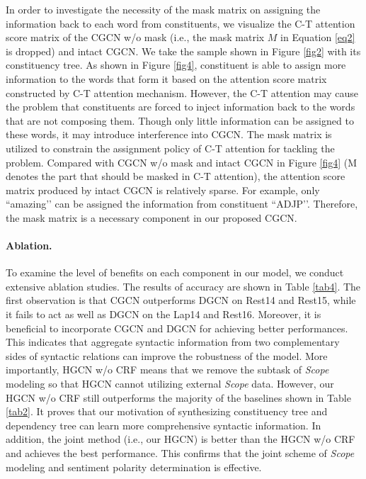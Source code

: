 \documentclass{article}
\begin{document}
In order to investigate the necessity of the mask matrix on assigning the information back to each word from constituents, we visualize the C-T attention score matrix of the CGCN w/o mask (i.e., the mask matrix $M$ in Equation \ref{eq2} is dropped) and intact CGCN. We take the sample shown in Figure \ref{fig2} with its constituency tree. As shown in Figure \ref{fig4}, constituent is able to assign more information to the words that form it based on the attention score matrix constructed by C-T attention mechanism. However, the C-T attention may cause the problem that constituents are forced to inject information back to the words that are not composing them. Though only little information can be assigned to these words, it may introduce interference into CGCN. The mask matrix is utilized to constrain the assignment policy of C-T attention for tackling the problem. Compared with CGCN w/o mask and intact CGCN in Figure \ref{fig4} (M denotes the part that should be masked in C-T attention), the attention score matrix produced by intact CGCN is relatively sparse. For example, only ``amazing’’ can be assigned the information from constituent ``ADJP’’. Therefore, the mask matrix is a necessary component in our proposed CGCN.

\paragraph{Ablation.}

To examine the level of benefits on each component in our model, we conduct extensive ablation studies. The results of accuracy are shown in Table \ref{tab4}. The first observation is that CGCN outperforms DGCN on Rest14 and Rest15, while it fails to act as well as DGCN on the Lap14 and Rest16. Moreover, it is beneficial to incorporate CGCN and DGCN for achieving better performances. This indicates that aggregate syntactic information from two complementary sides of syntactic relations can improve the robustness of the model. More importantly, HGCN w/o CRF means that we remove the subtask of \emph{Scope} modeling so that HGCN cannot utilizing external \emph{Scope} data. However, our HGCN w/o CRF still outperforms the majority of the baselines shown in Table \ref{tab2}. It proves that our motivation of synthesizing constituency tree and dependency tree can learn more comprehensive syntactic information. In addition, the joint method (i.e., our HGCN) is better than the HGCN w/o CRF and achieves the best performance. This confirms that the joint scheme of \emph{Scope} modeling and sentiment polarity determination is effective.
\end{document}
